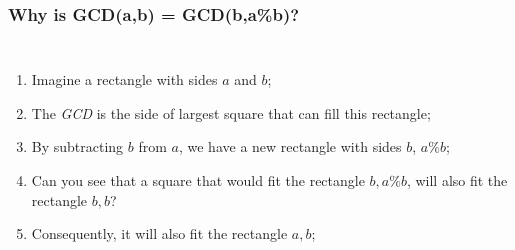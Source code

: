 \documentclass{beamer}
\begin{document}
\begin{frame}
  \frametitle{Why is GCD(a,b) = GCD(b,a\%b)?}
  \begin{columns}[c]
    {\small
    \begin{enumerate}
    \item Imagine a rectangle with sides $a$ and $b$;
    \item The \emph{GCD} is the side of largest square that can fill
      this rectangle;
    \item By subtracting $b$ from $a$, we have a new rectangle with
      sides $b$, $a\%b$;
    \item Can you see that a square that would fit the rectangle
      $b,a\%b$, will also fit the rectangle $b,b$?
    \item Consequently, it will also fit the rectangle $a,b$;
    \end{enumerate}
    }

\end{columns}
\end{frame}
\end{document}
